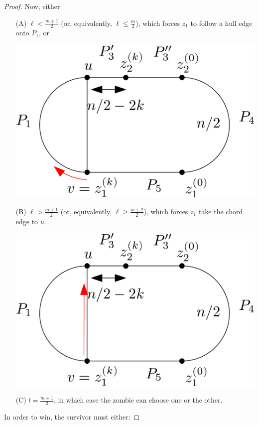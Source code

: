 \documentclass[letterpaper, 10pt]{article}
\begin{document}
\begin{proof}
Now, either
\begin{enumerate}
\item[(A)] $\ell < \frac{m+1}{2}$ (or, equivalently, $\ell \leq \frac{m}{2}$),
    which forces $z_1$ to follow a hull edge onto $P_1$, or
    \begin{center}
     \includegraphics[scale=0.15]{diagram6}
    \end{center}
\item[(B)] $\ell > \frac{m+1}{2}$ (or, equivalently, $\ell \geq \frac{m+2}{2}$),
    which forces $z_1$ take the chord edge to $u$.
    \begin{center}
     \includegraphics[scale=0.15]{diagram7}
    \end{center}
\item[(C)] $l = \frac{m+1}{2}$, in which case the zombie can choose one or the other.
\end{enumerate}

In order to win, the survivor must either:


\end{proof}
\end{document}

